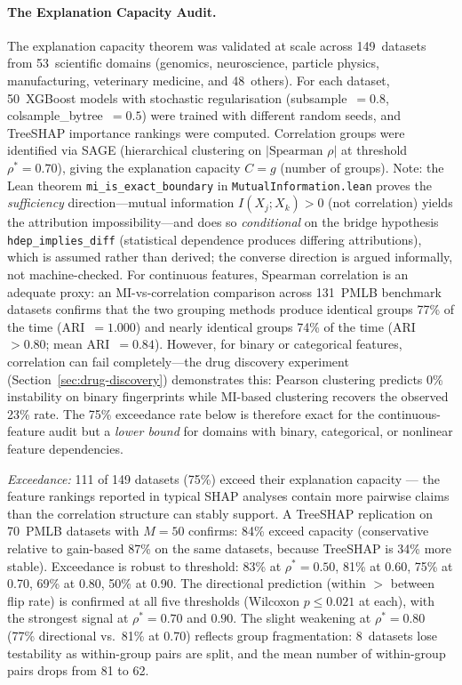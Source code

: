 \documentclass[11pt,a4paper]{article}
\begin{document}
\paragraph{The Explanation Capacity Audit.}
The explanation capacity theorem was validated at scale across 149~datasets from 53~scientific domains (genomics, neuroscience, particle physics, manufacturing, veterinary medicine, and 48~others).  For each dataset, 50~XGBoost models with stochastic regularisation (subsample~$= 0.8$, colsample\_bytree~$= 0.5$) were trained with different random seeds, and TreeSHAP importance rankings were computed.  Correlation groups were identified via SAGE (hierarchical clustering on $|\text{Spearman } \rho|$ at threshold $\rho^* = 0.70$), giving the explanation capacity $C = g$ (number of groups).  Note: the Lean theorem \texttt{mi\_is\_exact\_boundary} in \texttt{MutualInformation.lean} proves the \emph{sufficiency} direction---mutual information $I(X_j; X_k) > 0$ (not correlation) yields the attribution impossibility---and does so \emph{conditional} on the bridge hypothesis \texttt{hdep\_implies\_diff} (statistical dependence produces differing attributions), which is assumed rather than derived; the converse direction is argued informally, not machine-checked.  For continuous features, Spearman correlation is an adequate proxy: an MI-vs-correlation comparison across 131~PMLB benchmark datasets confirms that the two grouping methods produce identical groups 77\% of the time (ARI~$= 1.000$) and nearly identical groups 74\% of the time (ARI~$> 0.80$; mean ARI~$= 0.84$).  However, for binary or categorical features, correlation can fail completely---the drug discovery experiment (Section~\ref{sec:drug-discovery}) demonstrates this: Pearson clustering predicts 0\% instability on binary fingerprints while MI-based clustering recovers the observed 23\% rate.  The 75\% exceedance rate below is therefore exact for the continuous-feature audit but a \emph{lower bound} for domains with binary, categorical, or nonlinear feature dependencies.

\emph{Exceedance:} 111 of 149 datasets (75\%) exceed their explanation capacity --- the feature rankings reported in typical SHAP analyses contain more pairwise claims than the correlation structure can stably support.  A TreeSHAP replication on 70~PMLB datasets with $M = 50$ confirms: 84\% exceed capacity (conservative relative to gain-based 87\% on the same datasets, because TreeSHAP is 34\% more stable).  Exceedance is robust to threshold: 83\% at $\rho^* = 0.50$, 81\% at 0.60, 75\% at 0.70, 69\% at 0.80, 50\% at 0.90.  The directional prediction (within $>$ between flip rate) is confirmed at all five thresholds (Wilcoxon $p \leq 0.021$ at each), with the strongest signal at $\rho^* = 0.70$ and $0.90$.  The slight weakening at $\rho^* = 0.80$ (77\% directional vs.\ 81\% at 0.70) reflects group fragmentation: 8~datasets lose testability as within-group pairs are split, and the mean number of within-group pairs drops from 81 to 62.
\end{document}
